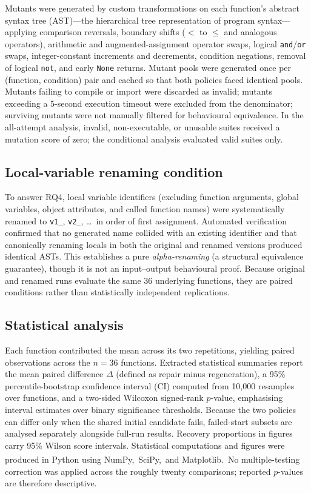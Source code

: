 \documentclass[11pt,a4paper]{article}
\newcommand{\ysjcite}[1]{\,\textsuperscript{\cite{#1}}}
\begin{document}
Mutants were generated by custom transformations on each function's abstract syntax tree (AST)---the hierarchical tree representation of program syntax---applying comparison reversals, boundary shifts ($<$ to $\le$ and analogous operators), arithmetic and augmented-assignment operator swaps, logical \texttt{and}/\texttt{or} swaps, integer-constant increments and decrements, condition negations, removal of logical \texttt{not}, and early \texttt{None} returns. Mutant pools were generated once per (function, condition) pair and cached so that both policies faced identical pools. Mutants failing to compile or import were discarded as invalid; mutants exceeding a 5-second execution timeout were excluded from the denominator; surviving mutants were not manually filtered for behavioural equivalence. In the all-attempt analysis, invalid, non-executable, or unusable suites received a mutation score of zero; the conditional analysis evaluated valid suites only.

\subsection{Local-variable renaming condition}\label{sec:renaming}
To answer RQ4, local variable identifiers (excluding function arguments, global variables, object attributes, and called function names) were systematically renamed to \texttt{v1\_}, \texttt{v2\_}, \ldots\ in order of first assignment. Automated verification confirmed that no generated name collided with an existing identifier and that canonically renaming locals in both the original and renamed versions produced identical ASTs. This establishes a pure \emph{alpha-renaming} (a structural equivalence guarantee), though it is not an input--output behavioural proof. Because original and renamed runs evaluate the same 36 underlying functions, they are paired conditions rather than statistically independent replications.

\subsection{Statistical analysis}
Each function contributed the mean across its two repetitions, yielding paired observations across the $n = 36$ functions. Extracted statistical summaries report the mean paired difference $\Delta$ (defined as repair minus regeneration), a 95\% percentile-bootstrap confidence interval (CI) computed from 10{,}000 resamples over functions, and a two-sided Wilcoxon signed-rank $p$-value, emphasising interval estimates over binary significance thresholds. Because the two policies can differ only when the shared initial candidate fails, failed-start subsets are analysed separately alongside full-run results. Recovery proportions in figures carry 95\% Wilson score intervals. Statistical computations and figures were produced in Python using NumPy,\ysjcite{harris2020numpy} SciPy,\ysjcite{virtanen2020scipy} and Matplotlib.\ysjcite{hunter2007matplotlib} No multiple-testing correction was applied across the roughly twenty comparisons; reported $p$-values are therefore descriptive.
\end{document}
